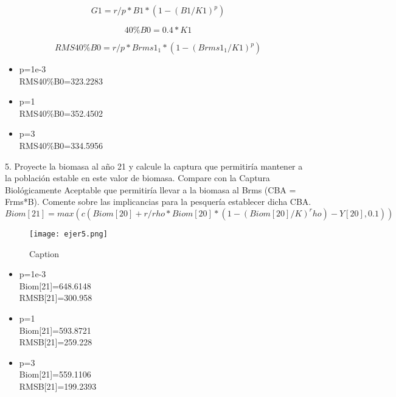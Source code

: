 \documentclass{uofa-eng-assignment}
\begin{document}
\begin{equation}
    G1=r/p*B1*(1-(B1/K1)^p) 
\end{equation}

\begin{equation}
        40\%B0=0.4*K1
\end{equation}

\begin{equation}
     RMS40\%B0=r/p*Brms1_1*(1-(Brms1_1/K1)^p)
\end{equation}

\begin{itemize}
    \item p=1e-3\\
    RMS40\%B0=323.2283
    \item p=1 \\
    RMS40\%B0=352.4502
    \item p=3 \\
    RMS40\%B0=334.5956
   
\end{itemize}

5. Proyecte la biomasa al año 21 y calcule la captura que permitiría mantener a la población estable en este valor de biomasa. Compare con la Captura Biológicamente Aceptable que permitiría llevar a la biomasa al Brms (CBA = Frms*B). Comente sobre las implicancias para la pesquería establecer dicha CBA.\\

\begin{equation}
    Biom[21]=max(c(Biom[20] + r/rho*Biom[20]*(1-(Biom[20]/K)^rho) - Y[20],0.1))
\end{equation}

\begin{figure}[H]
    \centering
    \texttt{[image: ejer5.png]}
    \caption{Caption}
    \label{fig:ejer5}
\end{figure}

\begin{itemize}
    \item p=1e-3\\
    Biom[21]=648.6148\\
    RMSB[21]=300.958
    \item p=1 \\
    Biom[21]=593.8721\\
    RMSB[21]=259.228
    \item p=3 \\
    Biom[21]=559.1106\\
    RMSB[21]=199.2393
  
\end{itemize}
\end{document}
